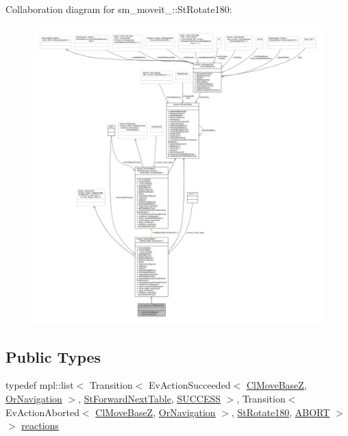 Collaboration diagram for sm\+\_\+moveit\+\_\+:\+:St\+Rotate180\+:
\nopagebreak
\begin{figure}[H]
\begin{center}
\leavevmode
\includegraphics[width=350pt]{structsm__moveit__3_1_1StRotate180__coll__graph}
\end{center}
\end{figure}
\subsection*{Public Types}
\begin{DoxyCompactItemize}
\item 
typedef mpl\+::list$<$ Transition$<$ Ev\+Action\+Succeeded$<$ \hyperlink{classcl__move__base__z_1_1ClMoveBaseZ}{Cl\+Move\+BaseZ}, \hyperlink{classsm__moveit__3_1_1OrNavigation}{Or\+Navigation} $>$, \hyperlink{structsm__moveit__3_1_1StForwardNextTable}{St\+Forward\+Next\+Table}, \hyperlink{classSUCCESS}{S\+U\+C\+C\+E\+SS} $>$, Transition$<$ Ev\+Action\+Aborted$<$ \hyperlink{classcl__move__base__z_1_1ClMoveBaseZ}{Cl\+Move\+BaseZ}, \hyperlink{classsm__moveit__3_1_1OrNavigation}{Or\+Navigation} $>$, \hyperlink{structsm__moveit__3_1_1StRotate180}{St\+Rotate180}, \hyperlink{classABORT}{A\+B\+O\+RT} $>$ $>$ \hyperlink{structsm__moveit__3_1_1StRotate180_ae04458fe6f264c42604facf6d3546be2}{reactions}
\end{DoxyCompactItemize}
